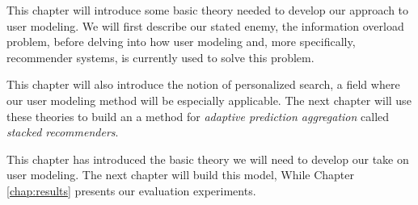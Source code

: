 \label{chap:theory}

This chapter will introduce some basic theory needed to develop our approach to user modeling.
We will first describe our stated enemy, the information overload problem, before delving into
how user modeling and, more specifically, recommender systems, is currently used to solve this problem.

This chapter will also introduce the notion of personalized search, a field where
our user modeling method will be especially applicable.
The next chapter will use these theories to build an 
a method for \emph{adaptive prediction aggregation}
called \emph{stacked recommenders}.






 
\hr

\noindent
This chapter has introduced the basic theory we will need to develop our take on user modeling.
The next chapter will build this model,
While Chapter \ref{chap:results} presents our evaluation experiments.


